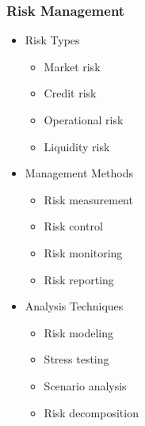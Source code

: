 \documentclass[conference]{IEEEtran}
\begin{document}
\subsubsection{Risk Management}
\begin{itemize}
    \item Risk Types
    \begin{itemize}
        \item Market risk
        \item Credit risk
        \item Operational risk
        \item Liquidity risk
    \end{itemize}
    
    \item Management Methods
    \begin{itemize}
        \item Risk measurement
        \item Risk control
        \item Risk monitoring
        \item Risk reporting
    \end{itemize}
    
    \item Analysis Techniques
    \begin{itemize}
        \item Risk modeling
        \item Stress testing
        \item Scenario analysis
        \item Risk decomposition
    \end{itemize}
\end{itemize}
\end{document}
